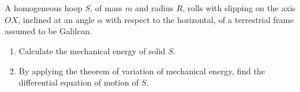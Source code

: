 \documentclass[12pt]{article}
\begin{document}
\section{}

A homogeneous hoop $S$, of mass $m$ and radius $R$, rolls with slipping on the axis $OX$, inclined at an angle $\alpha$ with respect to the horizontal, of a terrestrial frame assumed to be Galilean.

\begin{enumerate}
    \item Calculate the mechanical energy of solid $S$.
    \item By applying the theorem of variation of mechanical energy, find the differential equation of motion of $S$.
\end{enumerate}
\end{document}

